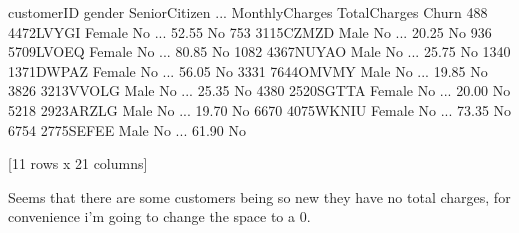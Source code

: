 \documentclass[letterpaper,10pt,english]{jupyterBook}
\begin{document}
\begin{sphinxVerbatim}[commandchars=\\\{\}]
      customerID  gender SeniorCitizen  ... MonthlyCharges TotalCharges  Churn
488   4472\PYGZhy{}LVYGI  Female            No  ...          52.55                  No
753   3115\PYGZhy{}CZMZD    Male            No  ...          20.25                  No
936   5709\PYGZhy{}LVOEQ  Female            No  ...          80.85                  No
1082  4367\PYGZhy{}NUYAO    Male            No  ...          25.75                  No
1340  1371\PYGZhy{}DWPAZ  Female            No  ...          56.05                  No
3331  7644\PYGZhy{}OMVMY    Male            No  ...          19.85                  No
3826  3213\PYGZhy{}VVOLG    Male            No  ...          25.35                  No
4380  2520\PYGZhy{}SGTTA  Female            No  ...          20.00                  No
5218  2923\PYGZhy{}ARZLG    Male            No  ...          19.70                  No
6670  4075\PYGZhy{}WKNIU  Female            No  ...          73.35                  No
6754  2775\PYGZhy{}SEFEE    Male            No  ...          61.90                  No

[11 rows x 21 columns]
\end{sphinxVerbatim}

\sphinxAtStartPar
Seems that there are some customers being so new they have no total charges, for convenience i’m going to change the space to a 0.

\begin{sphinxVerbatim}[commandchars=\\\{\}]
   
\end{sphinxVerbatim}

\begin{sphinxVerbatim}[commandchars=\\\{\}]
\PYG{p}{[}\PYG{p}{[} \PYG{p}{]}\PYG{p}{]}  \PYG{p}{[}\PYG{p}{[} \PYG{p}{]}\PYG{p}{]}
\end{sphinxVerbatim}
\end{document}
